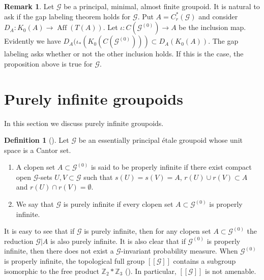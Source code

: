\documentclass[11pt]{article}
\theoremstyle{definition}
\newtheorem{definition}[theorem]{Definition}
\newtheorem{remark}[theorem]{Remark}
\numberwithin{equation}{section}
\newcommand{\Aff}{\operatorname{Aff}}
\newcommand{\G}{\mathcal{G}}
\newcommand{\Z}{\mathbb{Z}}
\begin{document}
\begin{remark}
Let $\G$ be a principal, minimal, almost finite groupoid. 
It is natural to ask if the gap labeling theorem holds for $\G$. 
Put $A=C^*_r(\G)$ and consider $D_A:K_0(A)\to\Aff(T(A))$. 
Let $\iota:C(\G^{(0)})\to A$ be the inclusion map. 
Evidently we have $D_A(\iota_*(K_0(C(\G^{(0)})))\subset D_A(K_0(A))$. 
The gap labeling asks whether or not the other inclusion holds. 
If this is the case, the proposition above is true for $\G$. 
\end{remark}




\section{Purely infinite groupoids}

In this section we discuss purely infinite groupoids. 

\begin{definition}[{\cite[Definition 4.9]{M15crelle}}]
Let $\G$ be an essentially principal \'etale groupoid 
whose unit space is a Cantor set. 
\begin{enumerate}
\item A clopen set $A\subset\G^{(0)}$ is said to be properly infinite 
if there exist compact open $\G$-sets $U,V\subset\G$ 
such that $s(U)=s(V)=A$, $r(U)\cup r(V)\subset A$ 
and $r(U)\cap r(V)=\emptyset$. 
\item We say that $\G$ is purely infinite 
if every clopen set $A\subset\G^{(0)}$ is properly infinite. 
\end{enumerate}
\end{definition}

It is easy to see that if $\G$ is purely infinite, then 
for any clopen set $A\subset\G^{(0)}$ 
the reduction $\G|A$ is also purely infinite. 
It is also clear that if $\G^{(0)}$ is properly infinite, 
then there does not exist a $\G$-invariant probability measure. 
When $\G^{(0)}$ is properly infinite, 
the topological full group $[[\G]]$ contains 
a subgroup isomorphic to the free product $\Z_2*\Z_3$ 
(\cite[Proposition 4.10]{M15crelle}). 
In particular, $[[\G]]$ is not amenable. 
\end{document}
